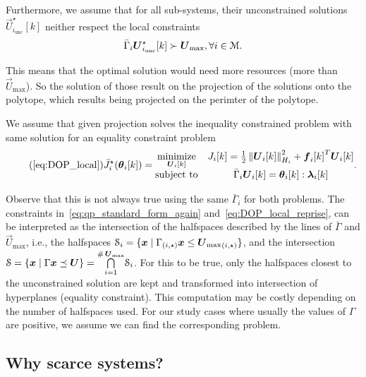 \documentclass[../main.tex]{subfiles}
\begin{document}
Furthermore, we assume that for all sub-systems, their unconstrained solutions $\vec{U}_{i_{\text{unc}}}^{\star}[k]$ neither respect the local constraints
\begin{equation}
\bar{\Gamma}_{i}\vec{U}_{i_{\text{unc}}}^{\star}[k]\succ {\vec{U}}_{\text{max}}, \forall i\in\set{M}.
\end{equation}

This means that the optimal solution would need more resources (more than $\vec{U}_{\max}$). So the solution of those \qp{} result on the projection of the solutions onto the polytope, which results being projected on the perimter of the polytope.

We assume that given projection solves the inequality constrained problem with same solution for an equality constraint problem
\begin{equation}
  \label{eq:DOP_local_equality}
  \tag{\ref*{eq:DOP_local}}
  \bar{J}_{i}^{\star}(\thetaik)=
  \begin{matrix}
    \underset{\vec{U}_{i}[k]}{\mathrm{minimize}}&\obji=\frac{1}{2}\norm{\vec{U}_{i}[k]}^{2}_{H_{i}} + {\vec{f}_{i}[k]}^{T}\vec{U}_{i}[k]\\
    \mathrm{subject~ to} & \bar{\Gamma}_{i}\vec{U}_{i}[k] = \thetaik:\lambdaik
  \end{matrix}.
\end{equation}

\begin{remark}
  Observe that this is not always true using the same $\bar{\Gamma}_{i}$ for both problems.
  The constraints in~\eqref{eq:qp_standard_form_again} and~\eqref{eq:DOP_local_reprise}, can be interpreted as the intersection of the halfspaces described by the lines of $\bar{\Gamma}$ and $\vec{U}_{\max}$, i.e., the halfspaces ${\set{S}_i=\setbuild{\vec{x}}{\elem[i,\star]{\Gamma}\vec{x}\leq\elem[i,\star]{\vec{U}_{\max}}}}$, and the intersection ${\set{S}=\setbuild{\vec{x}}{\Gamma\vec{x}\preceq\vec{U}}=\bigcap\limits_{i=1}^{\card\vec{U}_{\max}}}\set{S}_{i}$.
  For this to be true, only the halfspaces closest to the unconstrained solution are kept and transformed into intersection of hyperplanes (equality constraint).
  This computation may be costly depending on the number of halfspaces used.
  For our study cases where usually the values of $\Gamma$ are positive, we assume we can find the corresponding problem.
\end{remark}

\subsection{Why scarce systems?}\label{sec:why-scarce-systems}
\end{document}
